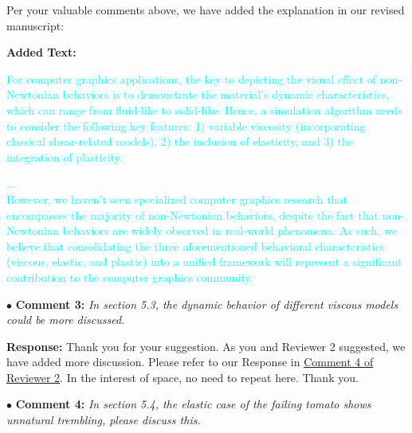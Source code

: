 \documentclass[12pt,a4paper]{article}
\newcommand{\revised}[1]{\textcolor{cyan}{#1}}
\begin{document}
Per your valuable comments above, we have added the explanation in our revised manuscript:

\vspace{0.4cm}
\textbf{Added Text:}

\revised{For computer graphics applications, the key to depicting the visual effect of non-Newtonian behaviors is to demonstrate the material’s dynamic characteristics, which can range from fluid-like to solid-like. Hence, a simulation algorithm needs to consider the following key features: 1) variable viscosity (incorporating classical shear-related models), 2) the inclusion of elasticity, and 3) the integration of plasticity.}

\revised{
 ... \\
However, we haven't seen specialized computer graphics research that encompasses the majority of non-Newtonian behaviors, despite the fact that non-Newtonian behaviors are widely observed in real-world phenomena. As such, we believe that consolidating the three aforementioned behavioral characteristics (viscous, elastic, and plastic) into a unified framework will represent a significant contribution to the computer graphics community.}

\vspace{0.4cm}
\noindent$\bullet$ \enspace \textbf{Comment 3:}
\textit{In section 5.3, the dynamic behavior of different viscous models could be more discussed.}


\vspace{0.2cm}
\textbf{Response:}
Thank you for your suggestion. As you and Reviewer 2 suggested, we have added more discussion. Please refer to our Response in \hyperref[Armadillos]{Comment 4 of Reviewer 2}. In the interest of space, no need to repeat here. Thank you. 

\vspace{0.4cm}
\noindent$\bullet$ \enspace \textbf{Comment 4:}
\textit{In section 5.4, the elastic case of the failing tomato shows unnatural trembling, please discuss this.}
\end{document}
